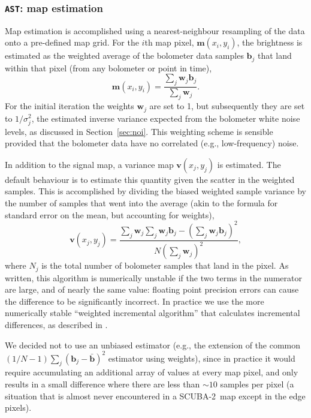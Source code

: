 \documentclass[useAMS,usenatbib,nofootinbib]{mn2e}
\newcommand{\scuba}{SCUBA-2}
\newcommand{\model}[1]{\texttt{#1}}
\begin{document}
\subsubsection{\model{AST}: map estimation}
\label{sec:ast}

Map estimation is accomplished using a nearest-neighbour resampling of
the data onto a pre-defined map grid. For the $i$th map pixel,
$\mathbf{m}(x_i,y_i)$, the brightness is estimated as the weighted
average of the bolometer data samples $\mathbf{b}_j$ that land within
that pixel (from any bolometer or point in time),
%
\begin{equation}
  \mathbf{m}(x_i,y_i) = \frac{\sum_j \mathbf{w}_j \mathbf{b}_j }
                             { \sum_j \mathbf{w}_j } .
\end{equation}
%
For the initial iteration the weights $\mathbf{w}_j$ are set to 1, but
subsequently they are set to $1/\sigma_j^2$, the estimated inverse
variance expected from the bolometer white noise levels, as discussed
in Section~\ref{sec:noi}. This weighting scheme is sensible provided
that the bolometer data have no correlated (e.g., low-frequency)
noise.

In addition to the signal map, a variance map $\mathbf{v}(x_j,y_j)$ is
estimated. The default behaviour is to estimate this quantity given
the scatter in the weighted samples. This is accomplished by dividing
the biased weighted sample variance by the number of samples that went
into the average (akin to the formula for standard error on the mean,
but accounting for weights),
%
\begin{equation}
\label{eq:varmap}
\mathbf{v}(x_j,y_j) = \frac{\sum_j \mathbf{w}_j
                            \sum_j \mathbf{w}_j \mathbf{b}_j -
                            \left( \sum_j \mathbf{w}_j \mathbf{b}_j \right)^2 }
                           { N \left( \sum_j \mathbf{w}_j \right)^2 },
\end{equation}
%
where $N_j$ is the total number of bolometer samples that land in the
pixel. As written, this algorithm is numerically unstable if the two
terms in the numerator are large, and of nearly the same value:
floating point precision errors can cause the difference to be
significantly incorrect. In practice we use the more numerically
stable ``weighted incremental algorithm'' that calculates incremental
differences, as described in \citet{west1979}.

We decided not to use an unbiased estimator (e.g., the extension of
the common $(1/N-1)\sum_j (\mathbf{b}_j - \bar{\mathbf{b}})^2$
estimator using weights), since in practice it would require
accumulating an additional array of values at every map pixel, and
only results in a small difference where there are less than $\sim10$
samples per pixel (a situation that is almost never encountered in a
\scuba\ map except in the edge pixels).
\end{document}
